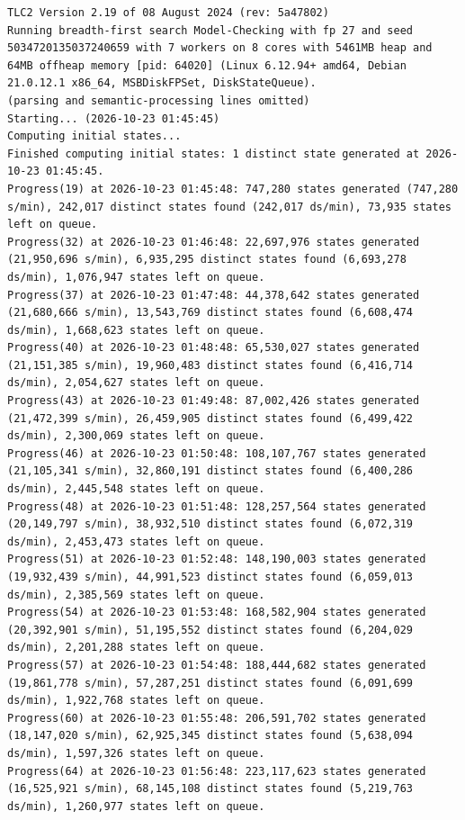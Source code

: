 \documentclass[11pt,a4paper]{article}
\begin{document}
\begin{lstlisting}[float, caption={SaeProvision\_racesfull.cfg result}, captionpos=t, label={lst:tlc-saeprovision-racesfull}]
TLC2 Version 2.19 of 08 August 2024 (rev: 5a47802)
Running breadth-first search Model-Checking with fp 27 and seed 5034720135037240659 with 7 workers on 8 cores with 5461MB heap and 64MB offheap memory [pid: 64020] (Linux 6.12.94+ amd64, Debian 21.0.12.1 x86_64, MSBDiskFPSet, DiskStateQueue).
(parsing and semantic-processing lines omitted)
Starting... (2026-10-23 01:45:45)
Computing initial states...
Finished computing initial states: 1 distinct state generated at 2026-10-23 01:45:45.
Progress(19) at 2026-10-23 01:45:48: 747,280 states generated (747,280 s/min), 242,017 distinct states found (242,017 ds/min), 73,935 states left on queue.
Progress(32) at 2026-10-23 01:46:48: 22,697,976 states generated (21,950,696 s/min), 6,935,295 distinct states found (6,693,278 ds/min), 1,076,947 states left on queue.
Progress(37) at 2026-10-23 01:47:48: 44,378,642 states generated (21,680,666 s/min), 13,543,769 distinct states found (6,608,474 ds/min), 1,668,623 states left on queue.
Progress(40) at 2026-10-23 01:48:48: 65,530,027 states generated (21,151,385 s/min), 19,960,483 distinct states found (6,416,714 ds/min), 2,054,627 states left on queue.
Progress(43) at 2026-10-23 01:49:48: 87,002,426 states generated (21,472,399 s/min), 26,459,905 distinct states found (6,499,422 ds/min), 2,300,069 states left on queue.
Progress(46) at 2026-10-23 01:50:48: 108,107,767 states generated (21,105,341 s/min), 32,860,191 distinct states found (6,400,286 ds/min), 2,445,548 states left on queue.
Progress(48) at 2026-10-23 01:51:48: 128,257,564 states generated (20,149,797 s/min), 38,932,510 distinct states found (6,072,319 ds/min), 2,453,473 states left on queue.
Progress(51) at 2026-10-23 01:52:48: 148,190,003 states generated (19,932,439 s/min), 44,991,523 distinct states found (6,059,013 ds/min), 2,385,569 states left on queue.
Progress(54) at 2026-10-23 01:53:48: 168,582,904 states generated (20,392,901 s/min), 51,195,552 distinct states found (6,204,029 ds/min), 2,201,288 states left on queue.
Progress(57) at 2026-10-23 01:54:48: 188,444,682 states generated (19,861,778 s/min), 57,287,251 distinct states found (6,091,699 ds/min), 1,922,768 states left on queue.
Progress(60) at 2026-10-23 01:55:48: 206,591,702 states generated (18,147,020 s/min), 62,925,345 distinct states found (5,638,094 ds/min), 1,597,326 states left on queue.
Progress(64) at 2026-10-23 01:56:48: 223,117,623 states generated (16,525,921 s/min), 68,145,108 distinct states found (5,219,763 ds/min), 1,260,977 states left on queue.

\end{lstlisting}
\end{document}
